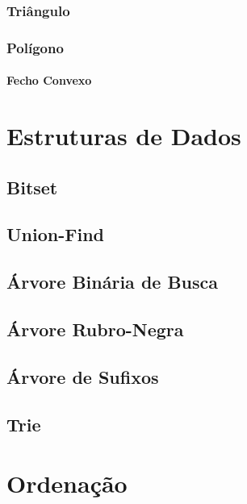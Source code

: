         \subsection{Triângulo}
            
            \newpage
        \subsection{Polígono}
            
            \newpage
            \subsubsection*{Fecho Convexo}
                
            \newpage
        
\chapter{Estruturas de Dados}
    \section{Bitset}
        
    \section{Union-Find}
        
    \newpage
    \section{Árvore Binária de Busca}
        
    \newpage
    \section{Árvore Rubro-Negra}
        
    \newpage
    \section{Árvore de Sufixos}
        
        \newpage
    \section{Trie}
        

\chapter{Ordenação}

